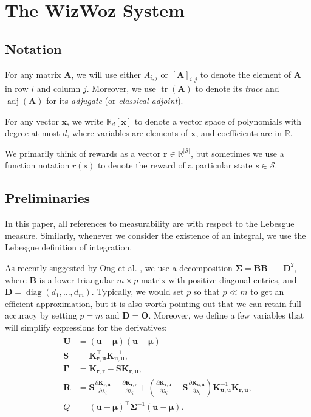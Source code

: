 \documentclass{mpaper}
\DeclareMathOperator{\diag}{diag}
\DeclareMathOperator{\adj}{adj}
\DeclareMathOperator{\tr}{tr}
\newcommand{\Kuu}{\mathbf{K}_{\mathbf{u},\mathbf{u}}}
\newcommand{\Krr}{\mathbf{K}_{\mathbf{r},\mathbf{r}}}
\newcommand{\Kru}{\mathbf{K}_{\mathbf{r},\mathbf{u}}}
\begin{document}
\section{The WizWoz System}

\subsection{Notation}

For any matrix $\mathbf{A}$, we will use either $A_{i,j}$ or
$[\mathbf{A}]_{i,j}$ to denote the element of $\mathbf{A}$ in row $i$ and column
$j$. Moreover, we use $\tr(\mathbf{A})$ to denote its \emph{trace} and
$\adj(\mathbf{A})$ for its \emph{adjugate} (or \emph{classical adjoint}).

For any vector $\mathbf{x}$, we write $\mathbb{R}_d[\mathbf{x}]$ to denote a
vector space of polynomials with degree at most $d$, where variables are
elements of $\mathbf{x}$, and coefficients are in $\mathbb{R}$.

We primarily think of rewards as a vector $\mathbf{r} \in
\mathbb{R}^{|\mathcal{S}|}$, but sometimes we use a function notation $r(s)$ to
denote the reward of a particular state $s \in \mathcal{S}$.

\subsection{Preliminaries}

In this paper, all references to measurability are with respect to the Lebesgue
measure. Similarly, whenever we consider the existence of an integral, we use
the Lebesgue definition of integration.

As recently suggested by Ong et al. \cite{ong2018gaussian}, we use a
decomposition $\bm\Sigma = \mathbf{B}\mathbf{B}^\intercal + \mathbf{D}^2$, where
$\mathbf{B}$ is a lower triangular $m \times p$ matrix with positive diagonal
entries, and $\mathbf{D} = \diag(d_1, \dots, d_m)$. Typically, we would set $p$
so that $p \ll m$ to get an efficient approximation, but it is also worth
pointing out that we can retain full accuracy by setting $p = m$ and $\mathbf{D}
= \mathbf{O}$. Moreover, we define a few variables that will simplify
expressions for the derivatives:
\begin{align*}
  \mathbf{U} &= (\mathbf{u} - \bm\mu)(\mathbf{u} - \bm\mu)^\intercal \\
  \mathbf{S} &= \Kru^\intercal\Kuu^{-1}, \\
  \bm\Gamma &= \Krr - \mathbf{S}\Kru, \\
  \mathbf{R} &= \mathbf{S}\frac{\partial \Kru}{\partial \lambda_i} - \frac{\partial \Krr}{\partial \lambda_i} + \left( \frac{\partial \Kru^\intercal}{\partial \lambda_i} - \mathbf{S}\frac{\partial \Kuu}{\partial \lambda_i} \right) \Kuu^{-1}\Kru, \\
  Q &= (\mathbf{u} - \bm\mu)^\intercal\bm\Sigma^{-1}(\mathbf{u} - \bm\mu).
\end{align*}
\end{document}
